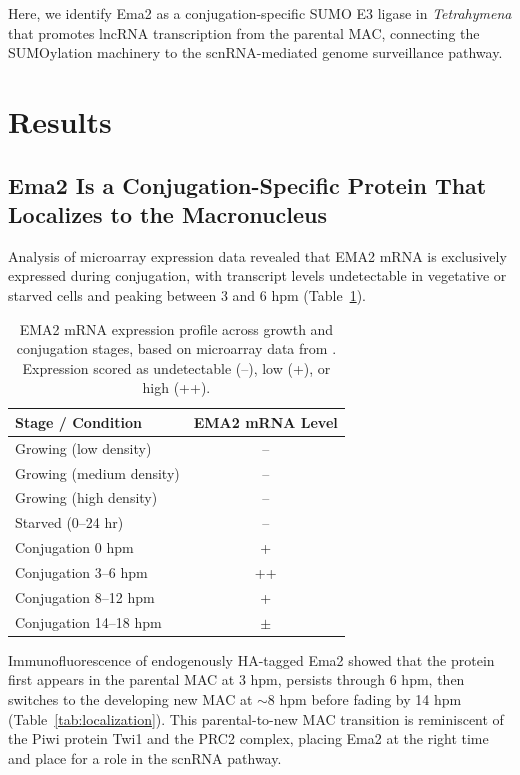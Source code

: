\documentclass[11pt]{article}
\begin{document}
Here, we identify Ema2 as a conjugation-specific SUMO E3 ligase in \textit{Tetrahymena} that promotes lncRNA transcription from the parental MAC, connecting the SUMOylation machinery to the scnRNA-mediated genome surveillance pathway.

\section{Results}

\subsection{Ema2 Is a Conjugation-Specific Protein That Localizes to the Macronucleus}

Analysis of microarray expression data \citep{miao2009microarray} revealed that EMA2 mRNA is exclusively expressed during conjugation, with transcript levels undetectable in vegetative or starved cells and peaking between 3 and 6 hpm (Table~\ref{tab:expression}).

\begin{table}[H]
\centering
\caption{EMA2 mRNA expression profile across growth and conjugation stages, based on microarray data from \citet{miao2009microarray}. Expression scored as undetectable (--), low (+), or high (++).}
\label{tab:expression}
\begin{tabular}{lc}
\toprule
\textbf{Stage / Condition} & \textbf{EMA2 mRNA Level} \\
\midrule
Growing (low density) & -- \\
Growing (medium density) & -- \\
Growing (high density) & -- \\
Starved (0--24 hr) & -- \\
Conjugation 0 hpm & + \\
Conjugation 3--6 hpm & ++ \\
Conjugation 8--12 hpm & + \\
Conjugation 14--18 hpm & $\pm$ \\
\bottomrule
\end{tabular}
\end{table}

Immunofluorescence of endogenously HA-tagged Ema2 showed that the protein first appears in the parental MAC at 3 hpm, persists through 6 hpm, then switches to the developing new MAC at $\sim$8 hpm before fading by 14 hpm (Table~\ref{tab:localization}). This parental-to-new MAC transition is reminiscent of the Piwi protein Twi1 and the PRC2 complex, placing Ema2 at the right time and place for a role in the scnRNA pathway.
\end{document}
